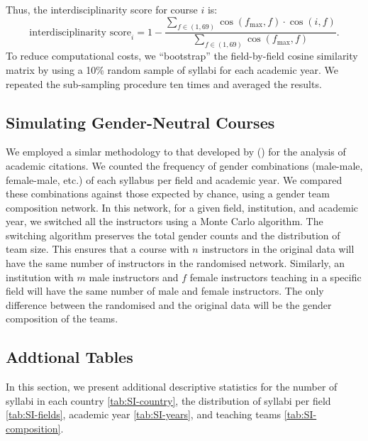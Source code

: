 \documentclass[
  british,
  12pt,
]{article}
\begin{document}
Thus, the interdisciplinarity score for course \(i\) is:
\[
  \text{interdisciplinarity score}_i = 1 - \frac{\sum_{f \in (1, 69)} \cos(f_{\max}, f) \cdot \cos(i, f)}{\sum_{f \in (1, 69)} \cos(f_{\max}, f)}. 
\]
To reduce computational costs, we ``bootstrap'' the field-by-field cosine similarity matrix by using a 10\% random sample of syllabi for each academic year. We repeated the sub-sampling procedure ten times and averaged the results.

\subsection{Simulating Gender-Neutral Courses}\label{si-simulations}

We employed a simlar methodology to that developed by () for the analysis of academic citations. We counted the frequency of gender combinations (male-male, female-male, etc.) of each syllabus per field and academic year. We compared these combinations against those expected by chance, using a gender team composition network. In this network, for a given field, institution, and academic year, we switched all the instructors using a Monte Carlo algorithm. The switching algorithm preserves the total gender counts and the distribution of team size. This ensures that a course with \(n\) instructors in the original data will have the same number of instructors in the randomised network. Similarly, an institution with \(m\) male instructors and \(f\) female instructors teaching in a specific field will have the same number of male and female instructors. The only difference between the randomised and the original data will be the gender composition of the teams.

\subsection{Addtional Tables}\label{addtional-tables}

In this section, we present additional descriptive statistics for the number of syllabi in each country \ref{tab:SI-country}, the distribution of syllabi per field \ref{tab:SI-fields}, academic year \ref{tab:SI-years}, and teaching teams \ref{tab:SI-composition}.
\end{document}

